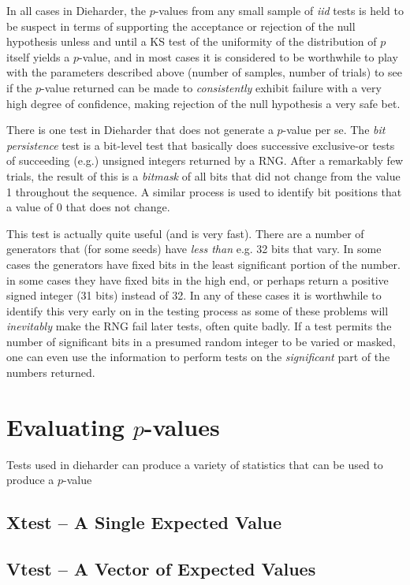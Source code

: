 \documentclass[12pt]{article}
\begin{document}
In all cases in Dieharder, the $p$-values from any small sample of {\em
iid} tests is held to be suspect in terms of supporting the acceptance
or rejection of the null hypothesis unless and until a KS test of the
uniformity of the distribution of $p$ itself yields a $p$-value, and in
most cases it is considered to be worthwhile to play with the parameters
described above (number of samples, number of trials) to see if the
$p$-value returned can be made to {\em consistently} exhibit failure
with a very high degree of confidence, making rejection of the null
hypothesis a very safe bet.

There is one test in Dieharder that does not generate a $p$-value per
se.  The {\em bit persistence} test is a bit-level test that basically
does successive exclusive-or tests of succeeding (e.g.) unsigned
integers returned by a RNG.  After a remarkably few trials, the result
of this is a {\em bitmask} of all bits that did not change from the
value 1 throughout the sequence.  A similar process is used to identify
bit positions that a value of 0 that does not change. 

This test is actually quite useful (and is very fast).  There are a
number of generators that (for some seeds) have {\em less than} e.g. 32
bits that vary.  In some cases the generators have fixed bits in the
least significant portion of the number. in some cases they have fixed
bits in the high end, or perhaps return a positive signed integer (31
bits) instead of 32.  In any of these cases it is worthwhile to identify
this very early on in the testing process as some of these problems will
{\em inevitably} make the RNG fail later tests, often quite badly.  If a
test permits the number of significant bits in a presumed random integer
to be varied or masked, one can even use the information to perform
tests on the {\em significant} part of the numbers returned.

\section{Evaluating $p$-values}

Tests used in dieharder can produce a variety of statistics that can be
used to produce a $p$-value

\subsection{Xtest -- A Single Expected Value}

\subsection{Vtest -- A Vector of Expected Values}
\end{document}
